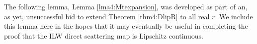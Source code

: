 \documentclass[../dissertation.tex]{subfiles}
\begin{document}


The following lemma, Lemma \ref{lma4:Mtexpansion}, was developed as part of an, as 
yet, unsuccessful bid to 
extend Theorem \ref{thm4:DlipR} to all real $r$. We include this lemma here in the 
hopes that it may eventually be useful in completing the proof that the ILW 
direct scattering map is Lipschitz continuous. 
\end{document}
